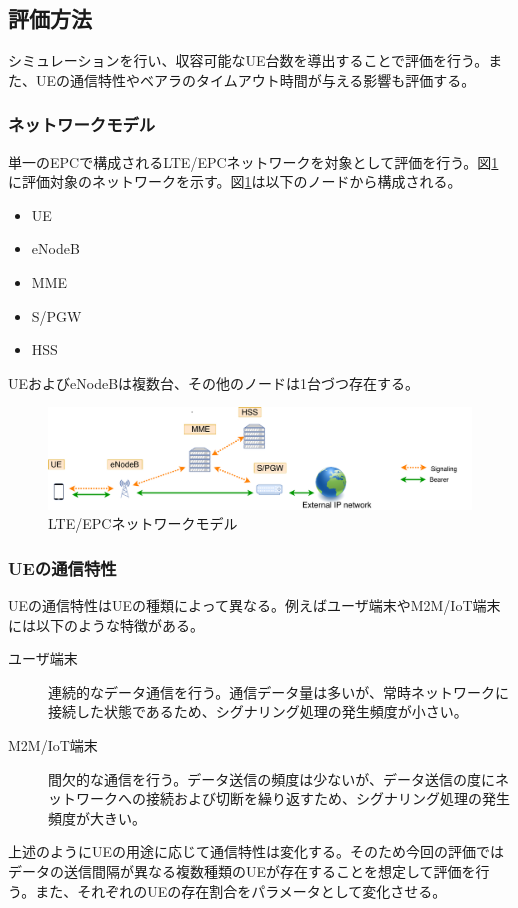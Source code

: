 \documentclass[a4j]{ujarticle}
\begin{document}
\subsection{評価方法}
\label{sec:method}
シミュレーションを行い、収容可能なUE台数を導出することで評価を行う。また、UEの通信特性やベアラのタイムアウト時間が与える影響も評価する。
\subsubsection{ネットワークモデル}
単一のEPCで構成されるLTE/EPCネットワークを対象として評価を行う。図\ref{networkmodel}に評価対象のネットワークを示す。図\ref{networkmodel}は以下のノードから構成される。
\begin{itemize}
  \item UE
  \item eNodeB
  \item MME
  \item S/PGW
	\item HSS
\end{itemize}
UEおよびeNodeBは複数台、その他のノードは1台づつ存在する。
\begin{figure}[htbp]
	\centering
	\includegraphics[width=0.7\hsize]{networkmodel.pdf}
  \caption{LTE/EPCネットワークモデル}
	\label{networkmodel}
\end{figure}
\subsubsection{UEの通信特性}
UEの通信特性はUEの種類によって異なる。例えばユーザ端末やM2M/IoT端末には以下のような特徴がある。
\begin{description}
  \item[ユーザ端末] 連続的なデータ通信を行う。通信データ量は多いが、常時ネットワークに接続した状態であるため、シグナリング処理の発生頻度が小さい。
  \item[M2M/IoT端末] 間欠的な通信を行う。データ送信の頻度は少ないが、データ送信の度にネットワークへの接続および切断を繰り返すため、シグナリング処理の発生頻度が大きい。
\end{description}
上述のようにUEの用途に応じて通信特性は変化する。そのため今回の評価ではデータの送信間隔が異なる複数種類のUEが存在することを想定して評価を行う。また、それぞれのUEの存在割合をパラメータとして変化させる。
\end{document}
